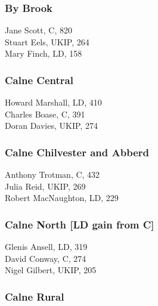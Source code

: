 \documentclass[a4paper,openany,10pt]{book}
\begin{document}
\subsubsection*{By Brook}



Jane Scott, C, 820\\
Stuart Eels, UKIP, 264\\
Mary Finch, LD, 158\\


\subsubsection*{Calne Central}



Howard Marshall, LD, 410\\
Charles Boase, C, 391\\
Doran Davies, UKIP, 274\\


\subsubsection*{Calne Chilvester and Abberd}



Anthony Trotman, C, 432\\
Julia Reid, UKIP, 269\\
Robert MacNaughton, LD, 229\\


\subsubsection*{Calne North \hspace*{\fill}\nolinebreak[1]%
\enspace\hspace*{\fill}
[LD gain from C]}



Glenis Ansell, LD, 319\\
David Conway, C, 274\\
Nigel Gilbert, UKIP, 205\\


\subsubsection*{Calne Rural}
\end{document}
